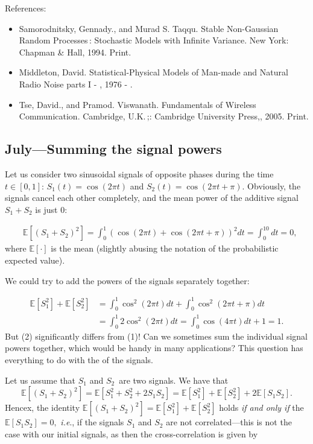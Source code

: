 \documentclass{article}
\begin{document}
References:
\begin{itemize}
\item Samorodnitsky, Gennady., and Murad S. Taqqu. Stable Non-Gaussian Random Processes : Stochastic Models with Infinite Variance. New York: Chapman & Hall, 1994. Print.
\item Middleton, David. Statistical-Physical Models of Man-made and Natural Radio Noise parts I - , 1976 - .
\item 
  Tse, David., and Pramod. Viswanath. Fundamentals of Wireless Communication. Cambridge, U.K. ;: Cambridge University Press,, 2005. Print.
\end{itemize}




\subsection{July---Summing the signal powers}

Let us consider two sinusoidal signals of opposite phases during the time $t \in [0,1]$: $S_1(t) = \cos(2 \pi t)$ and $S_2(t) = \cos(2 \pi t + \pi)$. Obviously, the signals cancel each other completely, and the mean power of the additive signal $ S_1 + S_2$ is just $0$:

\begin{align}
  &\mathbb{E}[(S_1 + S_2)^2] = \int_0^1 (\cos(2 \pi t) + \cos(2 \pi t + \pi))^2dt = \int_0^10 dt = 0, \tag{1}
\end{align}
where $\mathbb{E}[\cdot]$ is the mean (slightly abusing the notation of the probabilistic expected value).


We could try to add the powers of the signals separately together:

\begin{align}
  \mathbb{E}[S_1^2] + \mathbb{E}[S_2^2] &=   \int_0^1 \cos^2(2 \pi t) dt + \int_0^1 \cos^2(2 \pi  t + \pi) dt \tag{2} \\
  &= \int_0^1 2 \cos^2(2 \pi t)  dt= \int_0^1 \cos(4 \pi t)dt + 1 = 1. \nonumber
\end{align}
But (2) significantly differs from (1)! Can we sometimes sum the individual signal powers together, which would be handy in many applications? This question has everything to do with the  of the signals.

Let us assume that $S_1$ and $S_2$ are two signals. We have that
\begin{equation}
  \mathbb{E}[(S_1 + S_2)^2] = \mathbb{E}[S_1^2 + S_2^2 + 2 S_1 S_2]= \mathbb{E}[S_1^2] + \mathbb{E}[S_2^2] + 2 \mathbb{E}[S_1 S_2]. \tag{3}
\end{equation}
Hencex, the identity $\mathbb{E}[(S_1 + S_2)^2] = \mathbb{E}[S_1^2] + \mathbb{E}[S_2^2] $ holds \textit{if and only if} the  $\mathbb{E}[S_1 S_2] = 0,$ \textit{i.e}., if the signals $S_1$ and $S_2$ are not correlated---this is not the case with our initial signals, as then the cross-correlation is given by
\end{document}
